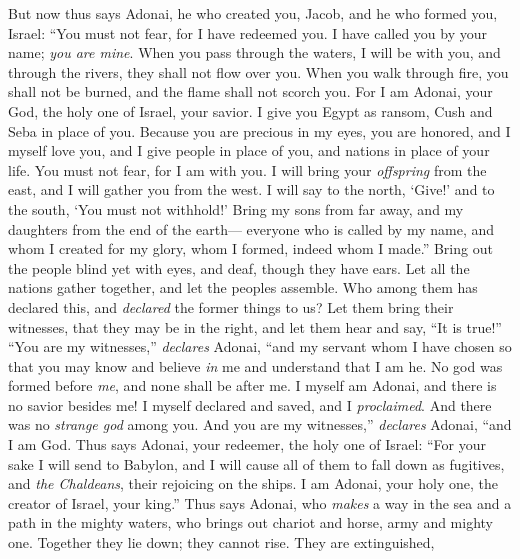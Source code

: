 \begin{biblechapter} %
 But now thus says Adonai,
\verse he who created you, Jacob, 
and he who formed you, Israel: 
“You must not fear, for I have redeemed you. 
I have called you by your name; \textit{you are mine}.
\verse When you pass through the waters, I will be with you, 
and through the rivers, they shall not flow over you. 
When you walk through fire, you shall not be burned, 
and the flame shall not scorch you.
\verse For I am Adonai, your God, 
the holy one of Israel, your savior. 
I give you Egypt as ransom, 
Cush and Seba in place of you.
\verse Because you are precious in my eyes, 
you are honored, and I myself love you, 
and I give people in place of you, 
and nations in place of your life.
\verse You must not fear, 
for I am with you. 
I will bring your \textit{offspring} from the east, 
and I will gather you from the west.
\verse I will say to the north, ‘Give!’ 
and to the south, ‘You must not withhold!’ 
Bring my sons from far away, 
and my daughters from the end of the earth—
\verse everyone who is called by my name, 
and whom I created for my glory, 
whom I formed, 
indeed whom I made.”
\verse Bring out the people blind yet with eyes, 
and deaf, though they have ears.
\verse Let all the nations gather together, 
and let the peoples assemble. 
Who among them has declared this, 
and \textit{declared} the former things to us? 
Let them bring their witnesses, that they may be in the right, 
and let them hear and say, “It is true!”
\verse “You are my witnesses,” \textit{declares} Adonai, 
“and my servant whom I have chosen 
so that you may know and believe \textit{in} me 
and understand that I am he. 
No god was formed before \textit{me}, 
and none shall be after me.
\verse I myself am Adonai, 
and there is no savior besides me!
\verse I myself declared and saved, 
and I \textit{proclaimed}. And there was no \textit{strange god} among you. 
And you are my witnesses,” \textit{declares} Adonai, 
“and I am God.
 Thus says Adonai, your redeemer, 
the holy one of Israel: 
“For your sake I will send to Babylon, 
and I will cause all of them to fall down as fugitives, 
and \textit{the Chaldeans}, their rejoicing on the ships.
\verse I am Adonai, your holy one, 
the creator of Israel, your king.”
\verse Thus says Adonai, who \textit{makes} a way in the sea 
and a path in the mighty waters,
\verse who brings out chariot and horse, 
army and mighty one. 
Together they lie down; 
they cannot rise. 
They are extinguished, 

\end{biblechapter}
